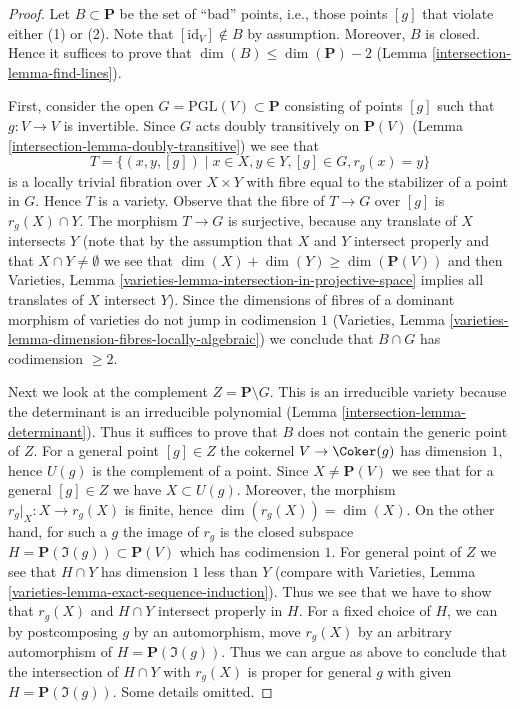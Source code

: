 \begin{proof}

Let $B \subset \mathbf{P}$ be the set of ``bad'' points, i.e., those
points $[g]$ that violate either (1) or (2). Note that
$[\text{id}_V] \not \in B$ by assumption. Moreover, $B$ is closed.
Hence it suffices to prove that $\dim(B) \leq \dim(\mathbf{P}) - 2$
(Lemma \ref{intersection-lemma-find-lines}).

\medskip\noindent
First, consider the open $G = \text{PGL}(V) \subset \mathbf{P}$
consisting of points $[g]$ such that $g : V \to V$ is invertible.
Since $G$ acts doubly transitively on $\mathbf{P}(V)$
(Lemma \ref{intersection-lemma-doubly-transitive})
we see that
$$
T = \{(x, y, [g]) \mid x \in X, y \in Y, [g] \in G, r_g(x) = y\}
$$
is a locally trivial fibration over $X \times Y$ with fibre equal
to the stabilizer of a point in $G$. Hence $T$ is a variety.
Observe that the fibre of $T \to G$ over $[g]$ is $r_g(X) \cap Y$.
The morphism $T \to G$ is surjective, because any translate of $X$
intersects $Y$ (note that by the assumption that $X$ and $Y$ intersect
properly and that $X \cap Y \not = \emptyset$ we see that
$\dim(X) + \dim(Y) \geq \dim(\mathbf{P}(V))$ and then
Varieties, Lemma \ref{varieties-lemma-intersection-in-projective-space}
implies all translates of $X$ intersect $Y$).
Since the dimensions of fibres of a dominant morphism of varieties do
not jump in codimension $1$
(Varieties, Lemma \ref{varieties-lemma-dimension-fibres-locally-algebraic})
we conclude that $B \cap G$ has codimension $\geq 2$.

\medskip\noindent
Next we look at the complement $Z = \mathbf{P} \setminus G$.
This is an irreducible variety because the determinant is an
irreducible polynomial (Lemma \ref{intersection-lemma-determinant}).
Thus it suffices to prove that $B$ does not contain the
generic point of $Z$. For a general point $[g] \in Z$
the cokernel $V \to \Coker(g)$ has dimension $1$, hence
$U(g)$ is the complement of a point. Since $X \not = \mathbf{P}(V)$
we see that for a general $[g] \in Z$ we have $X \subset U(g)$.
Moreover, the morphism $r_g|_X : X \to r_g(X)$ is finite, hence
$\dim(r_g(X)) = \dim(X)$.
On the other hand, for such a $g$ the image of $r_g$ is the
closed subspace $H = \mathbf{P}(\Im(g)) \subset \mathbf{P}(V)$
which has codimension $1$.
For general point of $Z$ we see that $H \cap Y$ has dimension $1$
less than $Y$ (compare with
Varieties, Lemma \ref{varieties-lemma-exact-sequence-induction}).
Thus we see that we have to show that $r_g(X)$ and $H \cap Y$
intersect properly in $H$. For a fixed choice of $H$, we can
by postcomposing $g$ by an automorphism, move $r_g(X)$ by
an arbitrary automorphism of $H = \mathbf{P}(\Im(g))$.
Thus we can argue as above to conclude that the intersection
of $H \cap Y$ with $r_g(X)$ is proper for general $g$ with given
$H = \mathbf{P}(\Im(g))$. Some details omitted.
\end{proof}

